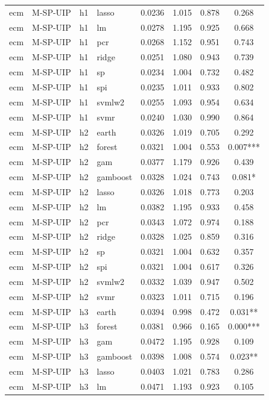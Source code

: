 \begin{ThreePartTable}
\begin{longtable}[t]{llclcccc}
ecm & M-SP-UIP & h1 & lasso & 0.0236 & 1.015 & 0.878 & 0.268\\
ecm & M-SP-UIP & h1 & lm & 0.0278 & 1.195 & 0.925 & 0.668\\
ecm & M-SP-UIP & h1 & pcr & 0.0268 & 1.152 & 0.951 & 0.743\\
ecm & M-SP-UIP & h1 & ridge & 0.0251 & 1.080 & 0.943 & 0.739\\
ecm & M-SP-UIP & h1 & sp & 0.0234 & 1.004 & 0.732 & 0.482\\
ecm & M-SP-UIP & h1 & spi & 0.0235 & 1.011 & 0.933 & 0.802\\
ecm & M-SP-UIP & h1 & svmlw2 & 0.0255 & 1.093 & 0.954 & 0.634\\
ecm & M-SP-UIP & h1 & svmr & 0.0240 & 1.030 & 0.990 & 0.864\\
\addlinespace
ecm & M-SP-UIP & h2 & earth & 0.0326 & 1.019 & 0.705 & 0.292\\
ecm & M-SP-UIP & h2 & forest & 0.0321 & 1.004 & 0.553 & 0.007***\\
ecm & M-SP-UIP & h2 & gam & 0.0377 & 1.179 & 0.926 & 0.439\\
ecm & M-SP-UIP & h2 & gamboost & 0.0328 & 1.024 & 0.743 & 0.081*\\
ecm & M-SP-UIP & h2 & lasso & 0.0326 & 1.018 & 0.773 & 0.203\\
ecm & M-SP-UIP & h2 & lm & 0.0382 & 1.195 & 0.933 & 0.458\\
ecm & M-SP-UIP & h2 & pcr & 0.0343 & 1.072 & 0.974 & 0.188\\
ecm & M-SP-UIP & h2 & ridge & 0.0328 & 1.025 & 0.859 & 0.316\\
ecm & M-SP-UIP & h2 & sp & 0.0321 & 1.004 & 0.632 & 0.357\\
ecm & M-SP-UIP & h2 & spi & 0.0321 & 1.004 & 0.617 & 0.326\\
ecm & M-SP-UIP & h2 & svmlw2 & 0.0332 & 1.039 & 0.947 & 0.502\\
ecm & M-SP-UIP & h2 & svmr & 0.0323 & 1.011 & 0.715 & 0.196\\
\addlinespace
ecm & M-SP-UIP & h3 & earth & 0.0394 & 0.998 & 0.472 & 0.031**\\
ecm & M-SP-UIP & h3 & forest & 0.0381 & 0.966 & 0.165 & 0.000***\\
ecm & M-SP-UIP & h3 & gam & 0.0472 & 1.195 & 0.928 & 0.109\\
ecm & M-SP-UIP & h3 & gamboost & 0.0398 & 1.008 & 0.574 & 0.023**\\
ecm & M-SP-UIP & h3 & lasso & 0.0403 & 1.021 & 0.783 & 0.286\\
ecm & M-SP-UIP & h3 & lm & 0.0471 & 1.193 & 0.923 & 0.105\\

\end{longtable}
\end{ThreePartTable}
